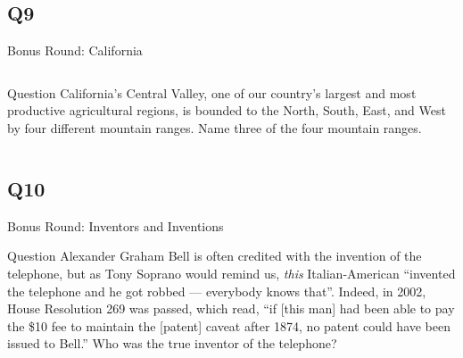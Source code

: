 \documentclass[11pt]{beamer}
\begin{document}
\subsection*{Q9}
\begin{frame}[t]{Bonus Round: California}
\begin{columns}[T,totalwidth=\linewidth]
\begin{column}{0.7\linewidth}
\begin{block}{Question}
California's Central Valley, one of our country's largest and most productive agricultural regions, is bounded to the North, South, East, and West by four different mountain ranges. Name three of the four mountain ranges.
\end{block}
\end{column}
\begin{column}{0.25\linewidth}
\begin{center}
\texttt{[image: \{Images/calitopomap]}.jpg}
\end{center}
\end{column}
\end{columns}
\end{frame}
\subsection*{Q10}
\begin{frame}[t]{Bonus Round: Inventors and Inventions}
\begin{block}{Question}
Alexander Graham Bell is often credited with the invention of the telephone, but as Tony Soprano would remind us, \emph{this} Italian-American ``invented the telephone and he got robbed --- everybody knows that''. Indeed, in 2002, House Resolution 269 was passed, which read, ``if [this man] had been able to pay the \$10 fee to maintain the [patent] caveat after 1874, no patent could have been issued to Bell.'' Who was the true inventor of the telephone?
\end{block}
\end{frame}
\end{document}
